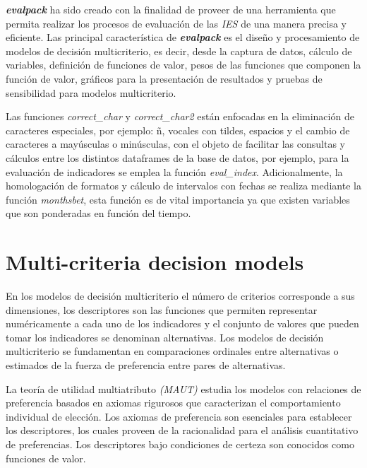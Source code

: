 \textit{\textbf{evalpack}} ha sido creado con la finalidad de proveer de una herramienta que permita
realizar los procesos de evaluación de las {\it IES} de una manera precisa y eficiente. Las
principal característica de \textit{\textbf{evalpack}} es el diseño y procesamiento de modelos de
decisión multicriterio, es decir, desde la captura de datos, cálculo de variables, definición de
funciones de valor, pesos de las funciones que componen la función de valor, gráficos para la
presentación de resultados y pruebas de sensibilidad para modelos multicriterio.
       
Las funciones {\it correct\_char} y {\it correct\_char2} están enfocadas en la eliminación
de caracteres especiales, por ejemplo: ñ, vocales con tildes, espacios y el cambio de caracteres a
mayúsculas o minúsculas, con el objeto de facilitar las consultas y cálculos entre los distintos
dataframes de la base de datos, por ejemplo, para la  evaluación de indicadores se emplea la función
{\it eval\_index}. Adicionalmente, la homologación de formatos y cálculo de intervalos con fechas se
realiza mediante la función {\it monthsbet}, esta función es de vital importancia ya que existen
variables que son ponderadas en función del tiempo.\\


\section{Multi-criteria decision models}
En los modelos de decisión multicriterio el número de criterios corresponde a sus dimensiones,
los descriptores son las funciones que permiten representar numéricamente a cada uno de los
indicadores y el conjunto de valores que pueden tomar los indicadores se denominan alternativas. Los
modelos de decisión multicriterio se fundamentan en comparaciones ordinales entre alternativas o
estimados de la fuerza de preferencia entre pares de alternativas\citep{3}.

La teoría de utilidad multiatributo \textit{(MAUT)} estudia los modelos con relaciones de
preferencia basados en axiomas rigurosos que caracterizan el comportamiento individual de elección.
Los axiomas de preferencia son esenciales para establecer los descriptores, los cuales proveen de la
racionalidad para el análisis cuantitativo de preferencias. Los descriptores bajo condiciones de
certeza son conocidos como funciones de valor.

